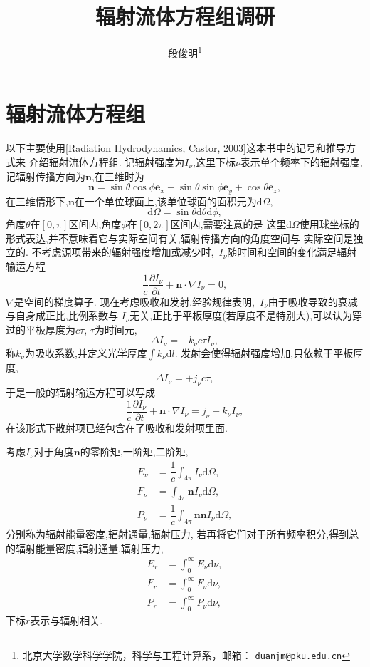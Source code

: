 \documentclass[a4paper, 11pt]{ctexart}
\title{辐射流体方程组调研}
\author{段俊明\thanks{北京大学数学科学学院，科学与工程计算系，邮箱： {\tt duanjm@pku.edu.cn}} }
\numberwithin{equation}{section}
\numberwithin{figure}{section}
\newcommand\dd{\mathrm{d}}
\newcommand\be{\boldsymbol{e}}
\newcommand\bn{\boldsymbol{n}}
\newcommand\pd[2]{\dfrac{\partial {#1}}{\partial {#2}}}
\begin{document}
\maketitle
\section{辐射流体方程组}
以下主要使用[Radiation Hydrodynamics, Castor, 2003]这本书中的记号和推导方式来
介绍辐射流体方程组.
记辐射强度为$I_\nu$,这里下标$\nu$表示单个频率下的辐射强度,
记辐射传播方向为$\bn$,在三维时为
\begin{equation}
  \bn=\sin\theta\cos\phi\be_x+ \sin\theta\sin\phi\be_y+ \cos\theta\be_z,
\end{equation}
在三维情形下,$\bn$在一个单位球面上,该单位球面的面积元为$\dd\Omega$,
\begin{equation}
  \dd\Omega=\sin\theta\dd\theta\dd\phi,
\end{equation}
角度$\theta$在$[0,\pi]$区间内,角度$\phi$在$[0,2\pi]$区间内,需要注意的是
这里$\dd\Omega$使用球坐标的形式表达,并不意味着它与实际空间有关,辐射传播方向的角度空间与
实际空间是独立的.
不考虑源项带来的辐射强度增加或减少时,~$I_\nu$随时间和空间的变化满足辐射输运方程
\begin{equation}
  \dfrac{1}{c}\pd{I_\nu}{t}+\bn\cdot\nabla I_\nu=0,
\end{equation}
$\nabla$是空间的梯度算子.
现在考虑吸收和发射.经验规律表明,~$I_\nu$由于吸收导致的衰减与自身成正比,比例系数与
$I_\nu$无关,正比于平板厚度(若厚度不是特别大),可以认为穿过的平板厚度为$c\tau$,
$\tau$为时间元,
\begin{equation}
  \Delta I_\nu=-k_\nu c\tau I_\nu,
\end{equation}
称$k_\nu$为吸收系数,并定义光学厚度$\int k_\nu\dd l$.
发射会使得辐射强度增加,只依赖于平板厚度,
\begin{equation}
  \Delta I_\nu=+j_\nu c\tau,
\end{equation}
于是一般的辐射输运方程可以写成
\begin{equation}
  \dfrac{1}{c}\pd{I_\nu}{t}+\bn\cdot\nabla I_\nu=j_\nu-k_\nu I_\nu,
  \label{eq:RTE}
\end{equation}
在该形式下散射项已经包含在了吸收和发射项里面.

考虑$I_\nu$对于角度$\bn$的零阶矩,一阶矩,二阶矩,
\begin{align}
  E_\nu&=\dfrac{1}{c}\int_{4\pi}I_\nu\dd\Omega,\\
  F_\nu&=\int_{4\pi}\bn I_\nu\dd\Omega,\\
  P_\nu&=\dfrac{1}{c}\int_{4\pi}\bn\bn I_\nu\dd\Omega,
\end{align}
分别称为辐射能量密度,辐射通量,辐射压力,
若再将它们对于所有频率积分,得到总的辐射能量密度,辐射通量,辐射压力,
\begin{align}
  E_r&=\int_0^\infty E_\nu\dd\nu,\\
  F_r&=\int_0^\infty F_\nu\dd\nu,\\
  P_r&=\int_0^\infty P_\nu\dd\nu,
\end{align}
下标$r$表示与辐射相关.
\end{document}
